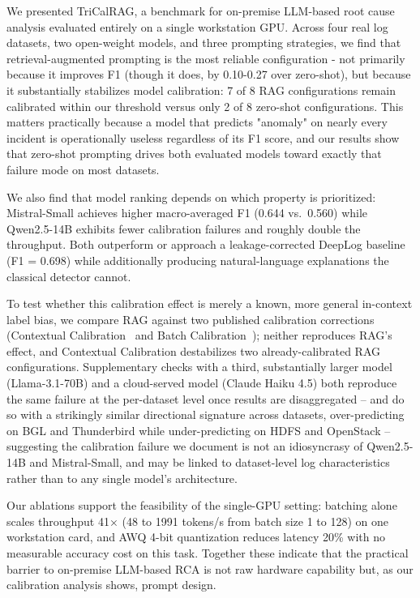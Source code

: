\documentclass[10pt,conference]{IEEEtran}
\begin{document}
We presented TriCalRAG, a benchmark for on-premise LLM-based root
cause analysis evaluated entirely on a single workstation GPU. Across four
real log datasets, two open-weight models, and three prompting strategies,
we find that retrieval-augmented prompting is the most reliable
configuration - not primarily because it improves F1 (though it does, by
0.10-0.27 over zero-shot), but because it substantially stabilizes model
calibration: 7 of 8 RAG configurations remain calibrated within our
threshold versus only 2 of 8 zero-shot configurations. This matters
practically because a model that predicts "anomaly" on nearly every
incident is operationally useless regardless of its F1 score, and our
results show that zero-shot prompting drives both evaluated models toward
exactly that failure mode on most datasets.

We also find that model ranking depends on which property is prioritized:
Mistral-Small achieves higher macro-averaged F1 (0.644 vs.\ 0.560) while
Qwen2.5-14B exhibits fewer calibration failures and roughly double the
throughput. Both outperform or approach a leakage-corrected DeepLog
baseline (F1 = 0.698) while additionally producing natural-language
explanations the classical detector cannot.

To test whether this calibration effect is merely a known, more general
in-context label bias, we compare RAG against two published calibration
corrections (Contextual Calibration~\cite{zhao2021calibrate} and Batch
Calibration~\cite{zhou2024batch}); neither reproduces RAG's effect, and
Contextual Calibration destabilizes two already-calibrated RAG
configurations. Supplementary checks with a third, substantially larger
model (Llama-3.1-70B) and a cloud-served model (Claude Haiku 4.5) both
reproduce the same failure at the per-dataset level once results are
disaggregated -- and do so with a strikingly similar directional
signature across datasets, over-predicting on BGL and Thunderbird while
under-predicting on HDFS and OpenStack -- suggesting the calibration
failure we document is not an idiosyncrasy of Qwen2.5-14B and
Mistral-Small, and may be linked to dataset-level log characteristics
rather than to any single model's architecture.

Our ablations support the feasibility of the single-GPU setting: batching
alone scales throughput 41$\times$ (48 to 1991 tokens/s from batch size 1
to 128) on one workstation card, and AWQ 4-bit quantization reduces
latency 20\% with no measurable accuracy cost on this task. Together these
indicate that the practical barrier to on-premise LLM-based RCA is not raw
hardware capability but, as our calibration analysis shows, prompt design.
\end{document}
